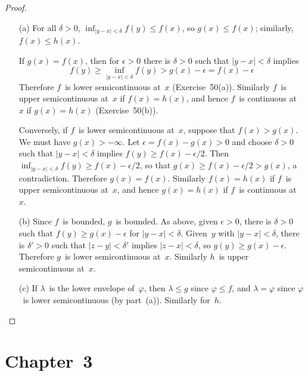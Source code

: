 \documentclass[letterpaper,12pt]{article}
\newcommand{\abs}[1]{|{#1}|}
\theoremstyle{plain}
\theoremstyle{definition}
\theoremstyle{remark}
\begin{document}
\begin{proof}\ 
\begin{enumerate}
\item[(a)] For all \(\delta>0\), \(\inf_{\abs{y-x}<\delta}f(y)\le f(x)\), so \(g(x)\le f(x)\); similarly, \(f(x)\le h(x)\).

If \(g(x)=f(x)\), then for \(\epsilon>0\) there is \(\delta>0\) such that \(\abs{y-x}<\delta\) implies
\[f(y)\ge\inf_{\abs{y-x}<\delta}f(y)>g(x)-\epsilon=f(x)-\epsilon\]
Therefore \(f\)~is lower semicontinuous at~\(x\) (Exercise~50(a)). Similarly \(f\)~is upper semicontinuous at~\(x\) if \(f(x)=h(x)\), and hence \(f\)~is continuous at~\(x\) if \(g(x)=h(x)\) (Exercise~50(b)).

Conversely, if \(f\)~is lower semicontinuous at~\(x\), suppose that \(f(x)>g(x)\). We must have \(g(x)>-\infty\). Let \(\epsilon=f(x)-g(x)>0\) and choose \(\delta>0\) such that \(\abs{y-x}<\delta\) implies \(f(y)\ge f(x)-\epsilon/2\). Then \(\inf_{\abs{y-x}<\delta}f(y)\ge f(x)-\epsilon/2\), so that \(g(x)\ge f(x)-\epsilon/2>g(x)\), a contradiction. Therefore \(g(x)=f(x)\). Similarly \(f(x)=h(x)\) if \(f\)~is upper semicontinuous at~\(x\), and hence \(g(x)=h(x)\) if \(f\)~is continuous at~\(x\).

\item[(b)] Since \(f\)~is bounded, \(g\)~is bounded. As above, given \(\epsilon>0\), there is \(\delta>0\) such that \(f(y)\ge g(x)-\epsilon\) for \(\abs{y-x}<\delta\). Given~\(y\) with \(\abs{y-x}<\delta\), there is \(\delta'>0\) such that \(\abs{z-y}<\delta'\) implies \(\abs{z-x}<\delta\), so \(g(y)\ge g(x)-\epsilon\). Therefore \(g\)~is lower semicontinuous at~\(x\). Similarly \(h\)~is upper semicontinuous at~\(x\).

\item[(c)] If \(\lambda\)~is the lower envelope of~\(\varphi\), then \(\lambda\le g\) since \(\varphi\le f\), and \(\lambda=\varphi\) since \(\varphi\)~is lower semicontinuous (by part~(a)). Similarly for~\(h\).\qedhere
\end{enumerate}
\end{proof}

\section*{Chapter~3}
\end{document}
